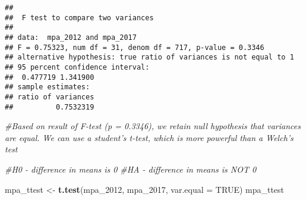 \documentclass[]{article}
\newenvironment{Shaded}{\begin{snugshade}}{\end{snugshade}}
\newcommand{\KeywordTok}[1]{\textcolor[rgb]{0.13,0.29,0.53}{\textbf{#1}}}
\newcommand{\DataTypeTok}[1]{\textcolor[rgb]{0.13,0.29,0.53}{#1}}
\newcommand{\DecValTok}[1]{\textcolor[rgb]{0.00,0.00,0.81}{#1}}
\newcommand{\StringTok}[1]{\textcolor[rgb]{0.31,0.60,0.02}{#1}}
\newcommand{\CommentTok}[1]{\textcolor[rgb]{0.56,0.35,0.01}{\textit{#1}}}
\newcommand{\OtherTok}[1]{\textcolor[rgb]{0.56,0.35,0.01}{#1}}
\newcommand{\OperatorTok}[1]{\textcolor[rgb]{0.81,0.36,0.00}{\textbf{#1}}}
\newcommand{\NormalTok}[1]{#1}
\begin{document}
\begin{Shaded}
\end{Shaded}

\begin{verbatim}
## 
##  F test to compare two variances
## 
## data:  mpa_2012 and mpa_2017
## F = 0.75323, num df = 31, denom df = 717, p-value = 0.3346
## alternative hypothesis: true ratio of variances is not equal to 1
## 95 percent confidence interval:
##  0.477719 1.341900
## sample estimates:
## ratio of variances 
##          0.7532319
\end{verbatim}

\begin{Shaded}
\begin{Highlighting}[]
\CommentTok{#Based on result of F-test (p = 0.3346), we retain null hypothesis that variances are equal. We can use a student's t-test, which is more powerful than a Welch's test}

\CommentTok{#H0 - difference in means is 0}
\CommentTok{#HA - difference in means is NOT 0}

\NormalTok{mpa_ttest <-}\StringTok{ }\KeywordTok{t.test}\NormalTok{(mpa_}\DecValTok{2012}\NormalTok{, mpa_}\DecValTok{2017}\NormalTok{, }\DataTypeTok{var.equal =} \OtherTok{TRUE}\NormalTok{)}
\NormalTok{mpa_ttest}
\end{Highlighting}
\end{Shaded}
\end{document}
